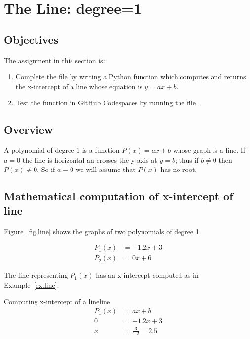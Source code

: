 \section{The Line: degree=1}
\label{sec.line}



\subsection{Objectives}
The assignment in this section is:
\begin{enumerate}
\item Complete the file  by writing a Python
  function which computes and returns the x-intercept of a line whose
  equation is ${y=a x + b}$.
\item Test the function in GitHub Codespaces by running the file
  .
\end{enumerate}

\subsection{Overview}


A polynomial of degree 1 is a function $P(x)=a x + b$ whose graph is a line.   If $a=0$ the
line is horizontal an crosses the y-axis at $y=b$; thus if $b\neq 0$ then $P(x)\neq 0$.
So if $a=0$ we will assume that $P(x)$ has no root.   

\subsection{Mathematical computation of x-intercept of line}


Figure~\ref{fig.line} shows the graphs of two polynomials of degree 1.

\begin{align*}
  P_1(x) &= -1.2 x + 3\\
  P_2(x) &= 0 x + 6
\end{align*}

The line representing $P_1(x)$ has an x-intercept computed as in Example~\ref{ex.line}.


\begin{example}{Computing x-intercept of a line}{line}
  \begin{align*}
  P_1(x) &= a x + b \\
  0  &= -1.2 x + 3\\
  x &= \frac{3}{1.2} = 2.5
  \end{align*}
\end{example}

